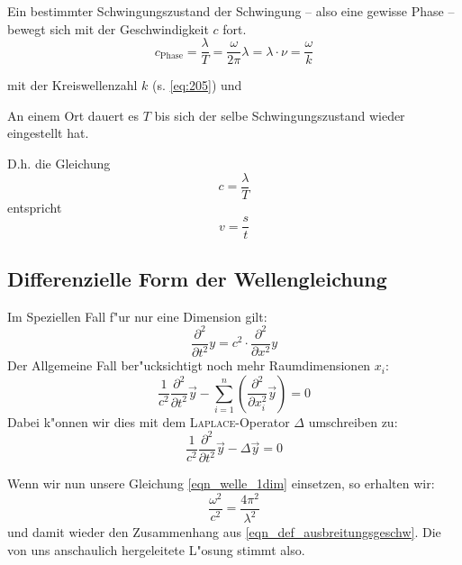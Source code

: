 \bigskip


\begin{Def}
    Ein bestimmter Schwingungszustand der Schwingung
   -- also eine gewisse Phase -- bewegt sich mit der Geschwindigkeit
   $c$ fort.
   \begin{equation}
      \label{eqn_def_ausbreitungsgeschw}
      c_\text{Phase} = \frac{\lambda}{T} = \frac{\omega}{2\pi} \lambda = \lambda
      \cdot \nu
=
\frac{\omega}{k}
   \end{equation}
\end{Def}
mit der Kreiswellenzahl $k$ (s. \eqref{eq:205}) und
\begin{Def}
An einem Ort dauert es $T$ bis sich der selbe Schwingungszustand
wieder eingestellt hat.
\end{Def}
D.h. die Gleichung 
$$
c = \frac{\lambda}{T}
$$
entspricht 
$$
v = \frac{s}{t}
$$




\subsection{Differenzielle Form der Wellengleichung}
\label{kap_differenzielle-form-wellengleichung}

Im Speziellen Fall f"ur nur eine Dimension gilt:
\begin{equation}
   \label{eq:149}
   \frac{\partial^2}{\partial t^2} y = c^2 \cdot
   \frac{\partial^2}{\partial x^2} y
\end{equation}
Der Allgemeine Fall ber"ucksichtigt noch mehr Raumdimensionen $x_i$:
\begin{equation}
   \label{eq:150}
   \frac{1}{c^2} \frac{\partial^2 }{\partial t^2} \vec y - \sum_{i=1}^n
   \left ( \frac{\partial ^2}{\partial x_i^2} \vec y \right ) = 0
\end{equation}
Dabei k"onnen wir dies mit dem \textsc{Laplace}-Operator $\Delta$
umschreiben zu:
\begin{equation}
   \label{eqn_wellengleichung}
\boxed{
  \frac{1}{c^2} \frac{\partial^2 }{\partial t^2} \vec y - \Delta
  \vec y = 0 
}
\end{equation}

Wenn wir nun unsere Gleichung \eqref{eqn_welle_1dim} einsetzen,
so erhalten wir:
\begin{equation}
   \label{eq:151}
   \frac{\omega^2}{c^2} = \frac{4\pi^2}{\lambda^2}
\end{equation}
und damit wieder den Zusammenhang aus
\eqref{eqn_def_ausbreitungsgeschw}. Die von uns anschaulich
hergeleitete L"osung stimmt also.










